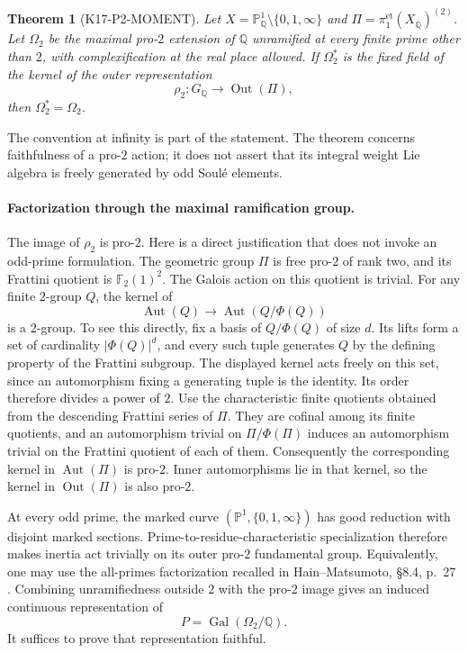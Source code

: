 \documentclass[11pt,a4paper]{article}
\newtheorem{theorem}{Theorem}[section]
\theoremstyle{definition}
\begin{document}
\begin{theorem}[K17-P2-MOMENT]\label{thm:pro2-kernel}
Let $X=\mathbb P^1_{\mathbb Q}\setminus\{0,1,\infty\}$ and $\Pi=\pi_1^{\mathrm{et}}(X_{\overline{\mathbb Q}})^{(2)}$. Let $\Omega_2$ be the maximal pro-$2$ extension of $\mathbb Q$ unramified at every finite prime other than $2$, with complexification at the real place allowed. If $\Omega_2^*$ is the fixed field of the kernel of the outer representation
\[
 \rho_2:G_{\mathbb Q}\longrightarrow\operatorname{Out}(\Pi),
\]
then $\Omega_2^*=\Omega_2$.
\end{theorem}

The convention at infinity is part of the statement. The theorem concerns faithfulness of a pro-$2$ action; it does not assert that its integral weight Lie algebra is freely generated by odd Soul\'e elements.

\paragraph{Factorization through the maximal ramification group.}
The image of $\rho_2$ is pro-$2$. Here is a direct justification that does not invoke an odd-prime formulation. The geometric group $\Pi$ is free pro-$2$ of rank two, and its Frattini quotient is $\mathbb F_2(1)^2$. The Galois action on this quotient is trivial. For any finite $2$-group $Q$, the kernel of
\[
 \operatorname{Aut}(Q)\longrightarrow
 \operatorname{Aut}(Q/\Phi(Q))
\]
is a $2$-group. To see this directly, fix a basis of $Q/\Phi(Q)$ of size $d$. Its lifts form a set of cardinality $|\Phi(Q)|^d$, and every such tuple generates $Q$ by the defining property of the Frattini subgroup. The displayed kernel acts freely on this set, since an automorphism fixing a generating tuple is the identity. Its order therefore divides a power of $2$. Use the characteristic finite quotients obtained from the descending Frattini series of $\Pi$. They are cofinal among its finite quotients, and an automorphism trivial on $\Pi/\Phi(\Pi)$ induces an automorphism trivial on the Frattini quotient of each of them. Consequently the corresponding kernel in $\operatorname{Aut}(\Pi)$ is pro-$2$. Inner automorphisms lie in that kernel, so the kernel in $\operatorname{Out}(\Pi)$ is also pro-$2$.

At every odd prime, the marked curve $(\mathbb P^1,\{0,1,\infty\})$ has good reduction with disjoint marked sections. Prime-to-residue-characteristic specialization therefore makes inertia act trivially on its outer pro-$2$ fundamental group. Equivalently, one may use the all-primes factorization recalled in Hain--Matsumoto, \S8.4, p.~27 \cite{HainMatsumoto2001}. Combining unramifiedness outside $2$ with the pro-$2$ image gives an induced continuous representation of
\[
 P=\operatorname{Gal}(\Omega_2/\mathbb Q).
\]
It suffices to prove that representation faithful.
\end{document}
